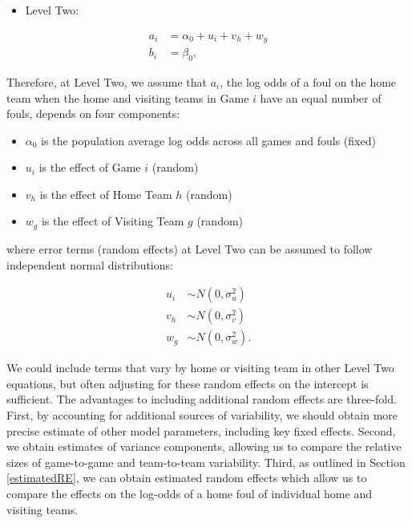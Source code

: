 \documentclass[
]{krantz}
\providecommand{\tightlist}{%
  \setlength{\itemsep}{0pt}\setlength{\parskip}{0pt}}
\begin{document}
\begin{itemize}
\tightlist
\item
  Level Two:
\end{itemize}

\begin{align*}
a_{i} & = \alpha_{0}+u_{i}+v_{h}+w_{g} \\
b_{i} & = \beta_{0},
\end{align*}

Therefore, at Level Two, we assume that \(a_{i}\), the log odds of a foul on the home team when the home and visiting teams in Game \(i\) have an equal number of fouls, depends on four components:

\begin{itemize}
\tightlist
\item
  \(\alpha_{0}\) is the population average log odds across all games and fouls (fixed)
\item
  \(u_{i}\) is the effect of Game \(i\) (random)
\item
  \(v_{h}\) is the effect of Home Team \(h\) (random)
\item
  \(w_{g}\) is the effect of Visiting Team \(g\) (random)
\end{itemize}

where error terms (random effects) at Level Two can be assumed to follow independent normal distributions:

\begin{align*}
u_{i} & \sim N \left( 0 , \sigma_{u}^{2} \right) \\
v_{h} & \sim N \left( 0 , \sigma_{v}^{2} \right) \\
w_{g} & \sim N \left( 0 , \sigma_{w}^{2} \right).
\end{align*}

We could include terms that vary by home or visiting team in other Level Two equations, but often adjusting for these random effects on the intercept is sufficient. The advantages to including additional random effects are three-fold. First, by accounting for additional sources of variability, we should obtain more precise estimate of other model parameters, including key fixed effects. Second, we obtain estimates of variance components, allowing us to compare the relative sizes of game-to-game and team-to-team variability. Third, as outlined in Section \ref{estimatedRE}, we can obtain estimated random effects which allow us to compare the effects on the log-odds of a home foul of individual home and visiting teams.
\end{document}

